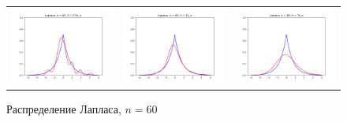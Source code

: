 	\begin{figure}[H]
		\centering
		\begin{tabular}{ccc}
			\includegraphics[width=55mm, height =0.25\textheight]{pics/ker_l_60_1.png}
			&
			\includegraphics[width=55mm, height =0.25\textheight]{pics/ker_l_60_2.png}
			&
			\includegraphics[width=55mm, height =0.25\textheight]{pics/ker_l_60_3.png}
		\end{tabular}
		\caption{Распределение Лапласа, $n = 60$}
		\label{fig:laplace}
	\end{figure}

